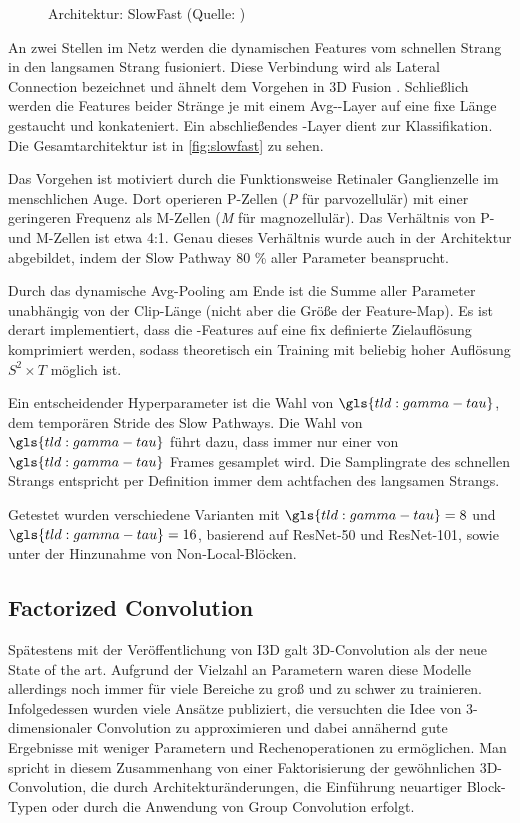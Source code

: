 \begin{figure}[h!]
    \centering
    \caption{Architektur: SlowFast (Quelle: \cite{Feichtenhofer18})}
    \label{fig:slowfast}
\end{figure}

An zwei Stellen im Netz werden die dynamischen Features vom schnellen Strang in den langsamen Strang fusioniert.
Diese Verbindung wird als Lateral Connection bezeichnet und ähnelt dem Vorgehen in 3D Fusion \cite{Feichtenhofer16}.
Schließlich werden die Features beider Stränge je mit einem Avg-\pool-Layer auf eine fixe Länge gestaucht und konkateniert.
Ein abschließendes \fc-Layer dient zur Klassifikation.
Die Gesamtarchitektur ist in \autoref{fig:slowfast} zu sehen.

Das Vorgehen ist motiviert durch die Funktionsweise Retinaler Ganglienzelle im menschlichen Auge.
Dort operieren P-Zellen (\emph{P} für parvozellulär) mit einer geringeren Frequenz als M-Zellen (\emph{M} für magnozellulär).
Das Verhältnis von P- und M-Zellen ist etwa 4:1.
Genau dieses Verhältnis wurde auch in der Architektur abgebildet, indem der Slow Pathway 80 \% aller Parameter beansprucht.

Durch das dynamische Avg-Pooling am Ende ist die Summe aller Parameter unabhängig von der Clip-Länge (nicht aber die Größe der Feature-Map).
Es ist derart implementiert, dass die \conv-Features auf eine fix definierte Zielauflösung komprimiert werden, sodass theoretisch ein Training mit beliebig hoher Auflösung $S^2 \times T$ möglich ist.

Ein entscheidender Hyperparameter ist die Wahl von $\gls{tld:gamma-tau}$, dem temporären Stride des Slow Pathways.
Die Wahl von $\gls{tld:gamma-tau}$ führt dazu, dass immer nur einer von $\gls{tld:gamma-tau}$ Frames gesamplet wird.
Die Samplingrate des schnellen Strangs entspricht per Definition immer dem achtfachen des langsamen Strangs.

Getestet wurden verschiedene Varianten mit $\gls{tld:gamma-tau} = 8$ und $\gls{tld:gamma-tau} = 16$, basierend auf ResNet-50 und ResNet-101, sowie unter der Hinzunahme von Non-Local-Blöcken.

\subsection{Factorized Convolution}
\label{subsec:factorized-convolution}

Spätestens mit der Veröffentlichung von I3D galt 3D-Convolution als der neue State of the art.
Aufgrund der Vielzahl an Parametern waren diese Modelle allerdings noch immer für viele Bereiche zu groß und zu schwer zu trainieren.
Infolgedessen wurden viele Ansätze publiziert, die versuchten die Idee von 3-dimensionaler Convolution zu approximieren und dabei annähernd gute Ergebnisse mit weniger Parametern und Rechenoperationen zu ermöglichen.
Man spricht in diesem Zusammenhang von einer Faktorisierung der gewöhnlichen 3D-Convolution, die durch Architekturänderungen, die Einführung neuartiger Block-Typen oder durch die Anwendung von Group Convolution erfolgt.

